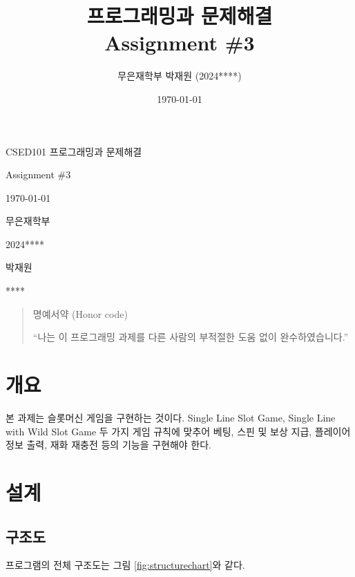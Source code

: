 \documentclass{article}
\title{프로그래밍과 문제해결 \\ Assignment \#3}
\author{무은재학부 박재원 (2024****)}
\date{\today}
\begin{document}
\begin{titlepage}
	\centering
	{\huge CSED101 프로그래밍과 문제해결\par}
	\vspace{0.5cm}
	{\LARGE Assignment \#3\par}
	\vspace{0.5cm}
	{\large \today\par}
	\vfill
  
  \begin{multicols}{2}
    \vphantom{}
    \columnbreak
  {
    \Large 
    \begin{description}[nosep, align=right, labelwidth=\widthof{00000000000000000}]
      \item[학과] 무은재학부
      \item[학번] 2024****
      \item[이름] 박재원
      \item[POVIS ID] ****
    \end{description}
  }
  \end{multicols}

  \vspace{1cm}


  \begin{quote}
    명예서약 (Honor code)

    ``나는 이 프로그래밍 과제를 다른 사람의 부적절한 도움 없이 완수하였습니다.''
  \end{quote}

\end{titlepage}

\tableofcontents

\section{개요}

본 과제는 슬롯머신 게임을 구현하는 것이다. 
Single Line Slot Game, Single Line with Wild Slot Game 두 가지 게임 규칙에 맞추어 
베팅, 스핀 및 보상 지급, 플레이어 정보 출력, 재화 재충전 등의 기능을 구현해야 한다.

\section{설계}

\subsection{구조도}

프로그램의 전체 구조도는 그림 \ref{fig:structurechart}와 같다. 
\end{document}

